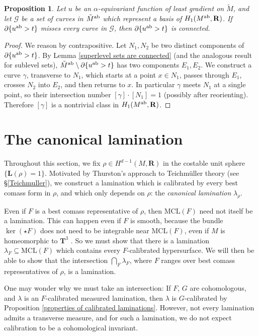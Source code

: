 \documentclass[reqno,11pt]{amsart}
\newcommand{\RR}{\mathbf{R}}
\newcommand{\MCL}{\mathrm{MCL}}
\newcommand{\Comass}{\mathbf L}
\newcommand{\dfn}[1]{\emph{#1}\index{#1}}
\newtheorem{proposition}[theorem]{Proposition}
\theoremstyle{definition}
\numberwithin{equation}{section}
\begin{document}
\begin{proposition}\label{abelian cover connected}
Let $u$ be an $\alpha$-equivariant function of least gradient on $\tilde M$, and let $\mathscr G$ be a set of curves in $\tilde M^{\rm ab}$ which represent a basis of $H_1(M^{\rm ab}, \RR)$.
If $\partial \{u^{\rm ab} > t\}$ misses every curve in $\mathscr G$, then $\partial \{u^{\rm ab} > t\}$ is connected.
\end{proposition}
\begin{proof}
We reason by contrapositive.
Let $N_1, N_2$ be two distinct components of $\partial \{u^{\rm ab} > t\}$.
By Lemma \ref{superlevel sets are connected} (and the analogous result for sublevel sets), $\tilde M^{\rm ab} \setminus \partial \{u^{\rm ab} > t\}$ has two components $E_1, E_2$.
We construct a curve $\gamma$, transverse to $N_1$, which starts at a point $x \in N_1$, passes through $E_1$, crosses $N_2$ into $E_2$, and then returns to $x$.
In particular $\gamma$ meets $N_1$ at a single point, so their intersection number $[\gamma] \cdot [N_1] = 1$ (possibly after reorienting).
Therefore $[\gamma]$ is a nontrivial class in $H_1(M^{\rm ab}, \RR)$.
\end{proof}

\section{The canonical lamination}
\label{canonical sec}
Throughout this section, we fix $\rho \in H^{d - 1}(M, \RR)$ in the costable unit sphere $\{\Comass(\rho) = 1\}$.
Motivated by Thurston's approach to Teichm\"uller theory (see \S\ref{Teichmuller}), we construct a lamination which is calibrated by every best comass form in $\rho$, and which only depends on $\rho$: the \dfn{canonical lamination} $\lambda_\rho$.

Even if $F$ is a best comass representative of $\rho$, then $\MCL(F)$ need not itself be a lamination.
This can happen even if $F$ is smooth, because the bundle $\ker(\star F)$ does not need to be integrable near $\MCL(F)$, even if $M$ is homeomorphic to $\mathbf T^3$ \cite[Example 5.4]{bangert_cui_2017}.
So we must show that there is a lamination $\lambda_F \subseteq \MCL(F)$ which contains every $F$-calibrated hypersurface.
We will then be able to show that the intersection $\bigcap_F \lambda_F$, where $F$ ranges over best comass representatives of $\rho$, is a lamination.

One may wonder why we must take an intersection:
If $F$, $G$ are cohomologous, and $\lambda$ is an $F$-calibrated measured lamination, then $\lambda$ is $G$-calibrated by Proposition \ref{properties of calibrated laminations}.
However, not every lamination admits a transverse measure, and for such a lamination, we do not expect calibration to be a cohomological invariant.
\end{document}
